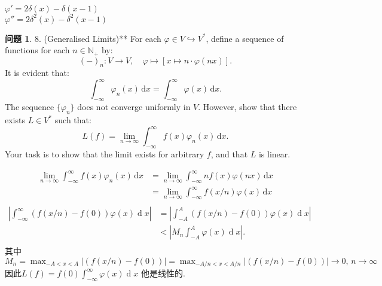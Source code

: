 \documentclass[11pt]{ctexart}
\theoremstyle{definition}
\newtheorem{qqq}{问题}[section]
\numberwithin{equation}{section}
\newcommand{\op}[1]{\operatorname{#1}}%
\theoremstyle{definition}
\theoremstyle{remark}
\begin{document}
\begin{aaa}
$\varphi'=2\delta(x)-\delta(x-1)$\\
$\varphi''=2\delta^2(x)-\delta^2(x-1)$
\end{aaa}
\begin{qqq}
    8. (Generalised Limits)** For each $\varphi \in V \hookrightarrow V^\ast$, define a sequence of functions for each $n \in \mathbb{N}_+$ by:
$$
(-)_n : V \to V, \quad \varphi \mapsto \left[x \mapsto n \cdot \varphi(nx)\right].
$$
It is evident that:
$$
\int_{-\infty}^\infty \varphi_n(x)\, \mathrm{d}x = \int_{-\infty}^\infty \varphi(x)\, \mathrm{d}x.
$$
The sequence $\{\varphi_n\}$ does not converge uniformly in $V$. However, show that there exists $L \in V^\ast$ such that:
$$
L(f) = \lim_{n \to \infty} \int_{-\infty}^\infty f(x)\varphi_n(x)\, \mathrm{d}x.
$$
Your task is to show that the limit exists for arbitrary $f$, and that $L$ is linear.

\end{qqq}
\begin{aaa}
    \begin{align*}
        \lim_{n \to \infty} \int_{-\infty}^\infty f(x)\varphi_n(x)\, \mathrm{d}x &= \lim_{n \to \infty} \int_{-\infty}^\infty nf(x)\varphi(nx)\, \mathrm{d}x \\
        &= \lim_{n \to \infty} \int_{-\infty}^\infty f(x/n)\varphi(x)\, \mathrm{d}x \\
    \end{align*}
    \begin{align*}
        |\int_{-\infty}^{\infty}(f(x/n)-f(0))\varphi(x)\op{d}x|&=|\int_{-A}^{A}(f(x/n)-f(0))\varphi(x)\op{d}x|\\
        &< |M_n\int_{-A}^{A}\varphi(x)\op{d}x|.\\
    \end{align*}
    其中$M_n=\max_{-A<x<A}|(f(x/n)-f(0))|=\max_{-A/n<x<A/n}|(f(x/n)-f(0))|\to 0,\, n\to \infty$\\
    因此$L(f)=f(0)\int_{-\infty}^{\infty}\varphi(x)\op{d}x$
    他是线性的.
\end{aaa}
\end{document}
